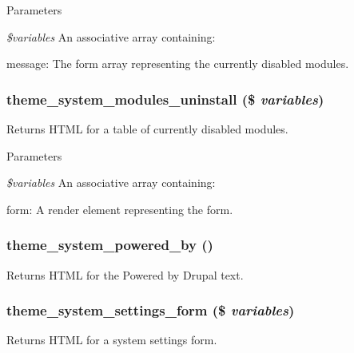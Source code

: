 \begin{DoxyParams}{Parameters}
\item[{\em \$variables}]An associative array containing:
\begin{DoxyItemize}
\item message: The form array representing the currently disabled modules. 
\end{DoxyItemize}\end{DoxyParams}
\hypertarget{group__themeable_ga9128d4735bfebfb459217e0b10d4400c}{
\subsubsection[{theme\_\-system\_\-modules\_\-uninstall}]{\setlength{\rightskip}{0pt plus 5cm}theme\_\-system\_\-modules\_\-uninstall (\$ {\em variables})}}
\label{group__themeable_ga9128d4735bfebfb459217e0b10d4400c}
Returns HTML for a table of currently disabled modules.


\begin{DoxyParams}{Parameters}
\item[{\em \$variables}]An associative array containing:
\begin{DoxyItemize}
\item form: A render element representing the form. 
\end{DoxyItemize}\end{DoxyParams}
\hypertarget{group__themeable_ga706047c3b15fd20658af56eb234573e4}{
\subsubsection[{theme\_\-system\_\-powered\_\-by}]{\setlength{\rightskip}{0pt plus 5cm}theme\_\-system\_\-powered\_\-by ()}}
\label{group__themeable_ga706047c3b15fd20658af56eb234573e4}
Returns HTML for the Powered by Drupal text. \hypertarget{group__themeable_ga61657b80e20cf36542ce65894984df79}{
\subsubsection[{theme\_\-system\_\-settings\_\-form}]{\setlength{\rightskip}{0pt plus 5cm}theme\_\-system\_\-settings\_\-form (\$ {\em variables})}}
\label{group__themeable_ga61657b80e20cf36542ce65894984df79}
Returns HTML for a system settings form.

